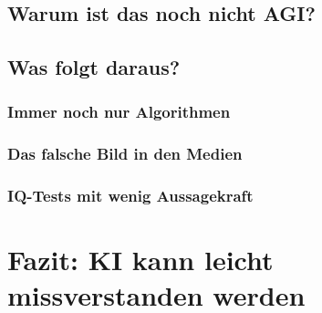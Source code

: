	
	
	
	\subsection{Warum ist das noch nicht AGI?}
	\subsection{Was folgt daraus?}
		\subsubsection{Immer noch nur Algorithmen}\label{s2ss4sss1}
		\subsubsection{Das falsche Bild in den Medien}\label{s2ss4sss2}
		\subsubsection{IQ-Tests mit wenig Aussagekraft}\label{s2ss4sss3}
\section{Fazit: KI kann leicht missverstanden werden}